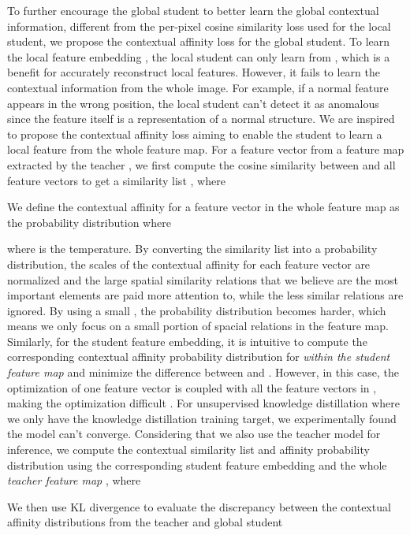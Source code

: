 \documentclass[10pt,twocolumn,letterpaper]{article}
\begin{document}
To further encourage the global student to better learn the global contextual information, different from the per-pixel cosine similarity loss used for the local student, we propose the contextual affinity loss for the global student. To learn the local feature embedding , the local student  can only learn from , which is a benefit for accurately reconstruct local features. However, it fails to learn the contextual information from the whole image. For example, if a normal feature appears in the wrong position, the local student can't detect it as anomalous since the feature itself is a representation of a normal structure. We are inspired to propose the contextual affinity loss aiming to enable the student to learn a local feature  from the whole feature map. 
For a feature vector  from a feature map extracted by the teacher , we first compute the cosine similarity between  and all feature vectors to get a similarity list , where 

We define the contextual affinity for a feature vector in the whole feature map as the probability distribution  where

where  is the temperature. By converting the similarity list into a probability distribution, the scales of the contextual affinity for each feature vector are normalized and the large spatial similarity relations that we believe are the most important elements are paid more attention to, while the less similar relations are ignored. By using a small , the probability distribution becomes harder, which means we only focus on a small portion of spacial relations in the feature map. 
Similarly, for the student feature embedding, it is intuitive to compute the corresponding contextual affinity probability distribution  for  \textit{within the student feature map}  and minimize the difference between  and . However, in this case, the optimization of one feature vector  is coupled with all the feature vectors in , making the optimization difficult \cite{krahenbuhl2011efficient}. For unsupervised knowledge distillation where we only have the knowledge distillation training target, we experimentally found the model can't converge. Considering that we also use the teacher model for inference, we compute the contextual similarity list  and affinity probability distribution  using the corresponding student feature embedding  and the whole \textit{teacher feature map} , where

We then use KL divergence to evaluate the discrepancy between the contextual affinity distributions from the teacher and global student
\end{document}
